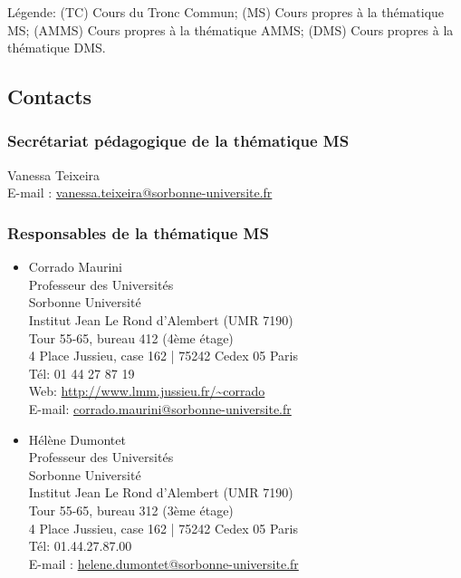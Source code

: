 \documentclass[french,11pt]{article}
\begin{document}
\noindent Légende: (TC) Cours du Tronc Commun; (MS) Cours propres à la thématique MS; (AMMS) Cours propres à la thématique AMMS; (DMS) Cours propres à la thématique DMS. 
\newpage
\subsection{Contacts}
\subsubsection{Secrétariat pédagogique de la thématique MS}

Vanessa Teixeira\\
E-mail : \href{vanessa.teixeira@sorbonne-universite.fr}{vanessa.teixeira@sorbonne-universite.fr}


\subsubsection{Responsables de la thématique MS}
\begin{itemize}
  \item 
Corrado Maurini\\
Professeur des Universités \\
Sorbonne Université\\
Institut Jean Le Rond d'Alembert (UMR 7190)\\
Tour 55-65, bureau 412 (4ème étage)\\
4 Place Jussieu, case 162 | 75242 Cedex 05 Paris\\
Tél: 01 44 27 87 19\\
Web: \url{http://www.lmm.jussieu.fr/~corrado}\\
E-mail: \href{mailto:corrado.maurini@sorbonne-universite.fr}{corrado.maurini@sorbonne-universite.fr}\\

\item Hélène Dumontet\\
Professeur des Universités \\
Sorbonne Université\\
Institut Jean Le Rond d'Alembert (UMR 7190)\\
Tour 55-65, bureau 312 (3ème étage)\\
4 Place Jussieu, case 162 | 75242 Cedex 05 Paris\\
Tél: 01.44.27.87.00 \\
E-mail : \href{mailto:helene.dumontet@sorbonne-universite.fr}{helene.dumontet@sorbonne-universite.fr}
 
\end{itemize}
\end{document}
